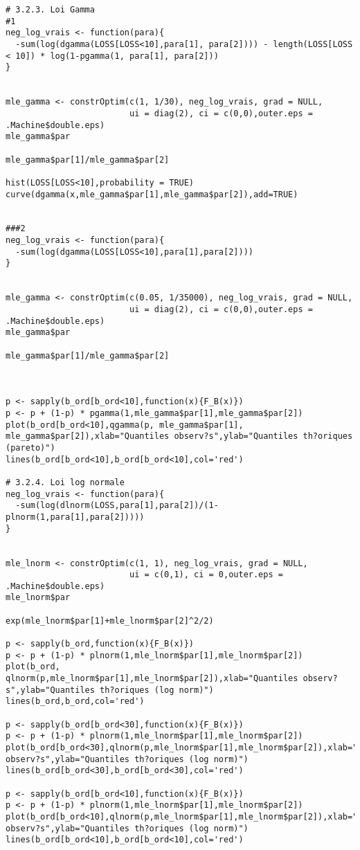 \begin{verbatim}
# 3.2.3. Loi Gamma
#1
neg_log_vrais <- function(para){
  -sum(log(dgamma(LOSS[LOSS<10],para[1], para[2]))) - length(LOSS[LOSS < 10]) * log(1-pgamma(1, para[1], para[2]))
}


mle_gamma <- constrOptim(c(1, 1/30), neg_log_vrais, grad = NULL, 
                         ui = diag(2), ci = c(0,0),outer.eps = .Machine$double.eps)
mle_gamma$par

mle_gamma$par[1]/mle_gamma$par[2]

hist(LOSS[LOSS<10],probability = TRUE)
curve(dgamma(x,mle_gamma$par[1],mle_gamma$par[2]),add=TRUE)


###2
neg_log_vrais <- function(para){
  -sum(log(dgamma(LOSS[LOSS<10],para[1],para[2])))
}


mle_gamma <- constrOptim(c(0.05, 1/35000), neg_log_vrais, grad = NULL, 
                         ui = diag(2), ci = c(0,0),outer.eps = .Machine$double.eps)
mle_gamma$par

mle_gamma$par[1]/mle_gamma$par[2]



p <- sapply(b_ord[b_ord<10],function(x){F_B(x)})
p <- p + (1-p) * pgamma(1,mle_gamma$par[1],mle_gamma$par[2])
plot(b_ord[b_ord<10],qgamma(p, mle_gamma$par[1], mle_gamma$par[2]),xlab="Quantiles observ?s",ylab="Quantiles th?oriques (pareto)")
lines(b_ord[b_ord<10],b_ord[b_ord<10],col='red')

# 3.2.4. Loi log normale
neg_log_vrais <- function(para){
  -sum(log(dlnorm(LOSS,para[1],para[2])/(1-plnorm(1,para[1],para[2]))))
}


mle_lnorm <- constrOptim(c(1, 1), neg_log_vrais, grad = NULL, 
                         ui = c(0,1), ci = 0,outer.eps = .Machine$double.eps)
mle_lnorm$par

exp(mle_lnorm$par[1]+mle_lnorm$par[2]^2/2)

p <- sapply(b_ord,function(x){F_B(x)})
p <- p + (1-p) * plnorm(1,mle_lnorm$par[1],mle_lnorm$par[2])
plot(b_ord, qlnorm(p,mle_lnorm$par[1],mle_lnorm$par[2]),xlab="Quantiles observ?s",ylab="Quantiles th?oriques (log norm)")
lines(b_ord,b_ord,col='red')

p <- sapply(b_ord[b_ord<30],function(x){F_B(x)})
p <- p + (1-p) * plnorm(1,mle_lnorm$par[1],mle_lnorm$par[2])
plot(b_ord[b_ord<30],qlnorm(p,mle_lnorm$par[1],mle_lnorm$par[2]),xlab="Quantiles observ?s",ylab="Quantiles th?oriques (log norm)")
lines(b_ord[b_ord<30],b_ord[b_ord<30],col='red')

p <- sapply(b_ord[b_ord<10],function(x){F_B(x)})
p <- p + (1-p) * plnorm(1,mle_lnorm$par[1],mle_lnorm$par[2])
plot(b_ord[b_ord<10],qlnorm(p,mle_lnorm$par[1],mle_lnorm$par[2]),xlab="Quantiles observ?s",ylab="Quantiles th?oriques (log norm)")
lines(b_ord[b_ord<10],b_ord[b_ord<10],col='red')



\end{verbatim}
